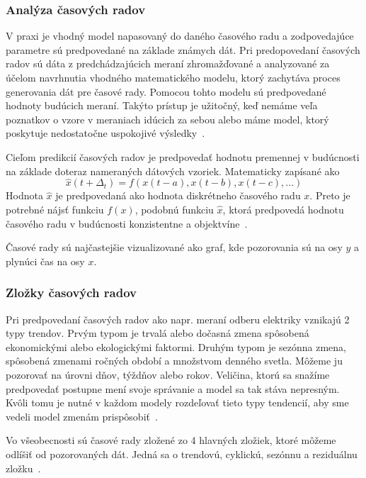 \documentclass[a4paper,slovak,12pt,appendix]{article}
\begin{document}
\subsubsection{Analýza časových radov}
V praxi je vhodný model napasovaný do daného časového radu a zodpovedajúce
parametre sú predpovedané na základe známych dát. Pri predopovedaní časových
radov sú dáta z predchádzajúcich meraní zhromažďované a analyzované za účelom
navrhnutia vhodného matematického modelu, ktorý zachytáva proces generovania
dát pre časové rady. Pomocou tohto modelu sú predpovedané hodnoty budúcich
meraní. Takýto prístup je užitočný, keď nemáme veľa poznatkov o vzore
v meraniach idúcich za sebou alebo máme model, ktorý poskytuje nedostatočne
uspokojivé výsledky~\cite{Agrawal2013}.

Cieľom predikcií časových radov je predpovedať hodnotu premennej v budúcnosti
na základe doteraz nameraných dátových vzoriek. Matematicky zapísané ako
\begin{equation}
  \hat{x}(t+\Delta_t) = f(x(t-a), x(t-b), x(t-c), ...)
  \label{eq-series}
\end{equation}
Hodnota $\hat{x}$ je predpovedaná ako hodnota diskrétneho časového radu $x$.
Preto je potrebné nájsť funkciu $f(x)$, podobnú funkciu $\hat{x}$, ktorá
predpovedá hodnotu časového radu v budúcnosti konzistentne
a objektvíne~\cite{Sapankevych2009}.

Časové rady sú najčastejšie vizualizované ako graf, kde pozorovania sú na
osy $y$ a plynúci čas na osy $x$.

\subsubsection{Zložky časových radov}
Pri predpovedaní časových radov ako napr. meraní odberu elektriky vznikajú
2 typy trendov. Prvým typom je trvalá alebo dočasná zmena spôsobená
ekonomickými alebo ekologickými faktormi. Druhým typom je sezónna zmena,
spôsobená zmenami ročných období a množstvom denného svetla. Môžeme ju pozorovať
na úrovni dňov, týždňov alebo rokov. Veličina, ktorú sa snažíme predpovedať
postupne mení svoje správanie a model sa tak stáva nepresným. Kvôli tomu je
nutné v každom modely rozdeľovať tieto typy tendencií, aby sme vedeli model
zmenám prispôsobiť~\cite{Grmanova2016}.

Vo všeobecnosti sú časové rady zložené zo 4 hlavných zložiek, ktoré môžeme
odlíšiť od pozorovaných dát. Jedná sa o trendovú, cyklickú, sezónnu
a reziduálnu zložku~\cite{Agrawal2013}.
\end{document}
